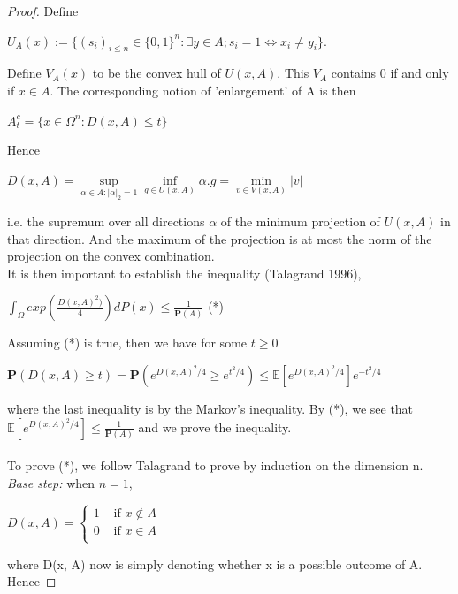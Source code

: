 \documentclass{article}
\begin{document}
\begin{proof}
     Define
    \begin{center}
        $U_A(x) := \{(s_i)_{i \leq n} \in \{0,1\}^n:\exists y\in A; s_i = 1 \iff x_i \neq y_i\}$.
    \end{center}
    Define $V_A(x)$ to be the convex hull of $U(x, A)$. This $V_A$ contains 0 if and only if $x\in A$. The corresponding notion of 'enlargement' of A is then
    \begin{center}
        $A_t^c =\{ x \in \Omega^n : D(x, A)\leq t\}$
    \end{center}
    Hence
    \begin{center}
        $D(x, A) = \sup\limits_{\alpha \in A:|\alpha|_2 = 1} \inf\limits_{g\in U(x, A)} \alpha.g = \min\limits_{v\in V(x, A)}|v|$
    \end{center}
    i.e. the supremum over all directions $\alpha$ of the minimum projection of $U(x,A)$ in that direction. And the maximum of the projection is at most the norm of the projection on the convex combination.\\
    It is then important to establish the inequality (Talagrand 1996), 
    \begin{center}
        $\int_{\Omega}exp(\frac{D(x, A)^2)}{4})dP(x) \leq \frac{1}{\mathbf{P}(A)}$   (*)
    \end{center}
    Assuming (*) is true, then we have for some $t \geq 0$
    \begin{center}
        $\mathbf{P}\left(D(x,A)\geq t\right)  = \mathbf{P}\left(e^{D(x,A)^2/4}\geq e^{t^2/4}\right) \leq \mathbb{E}\left[e^{D(x,A)^2/4}\right]e^{-t^2/4}$
    \end{center}
    where the last inequality is by the Markov's inequality. By (*), we see that $\mathbb{E}[e^{D(x,A)^2/4}] \leq \frac{1}{\mathbf{P}(A)}$ and we prove the inequality.\\
    \\
    To prove (*), we follow Talagrand to prove by induction on the dimension n.\\
    \textit{Base step:} when $n=1$,
    \begin{center}
        $D(x, A) = \begin{cases}
        1 &\text{ if }x \notin A \\
        0 &\text{ if }x \in A \\
    \end{cases}$
    \end{center}
    where D(x, A) now is simply denoting whether x is a possible outcome of A. Hence

\end{proof}
\end{document}
